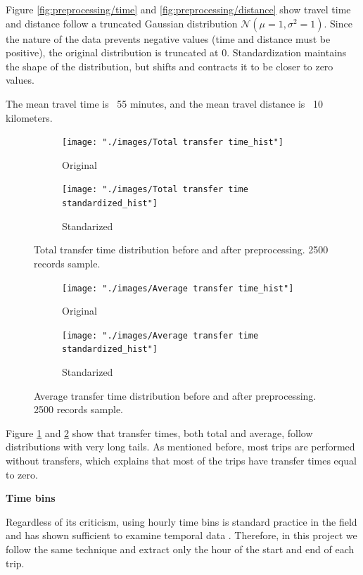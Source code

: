\documentclass{article}
\begin{document}
Figure \ref{fig:preprocessing/time} and \ref{fig:preprocessing/distance} show travel time and distance follow a truncated Gaussian distribution $\mathcal{N}(\mu = 1, \sigma^2 = 1)$. Since the nature of the data prevents negative values (time and distance must be positive), the original distribution is truncated at 0. Standardization maintains the shape of the distribution, but shifts and contracts it to be closer to zero values.

The mean travel time is ~55 minutes, and the mean travel distance is ~10 kilometers.  
 
\begin{figure}[H]
  \centering
  \begin{subfigure}[b]{.45\textwidth}
  	\centering
  	\texttt{[image: "./images/Total transfer time\_hist"]}
  	\caption{Original}
  \end{subfigure}
  \begin{subfigure}[b]{.45\textwidth}
  	\centering
  	\texttt{[image: "./images/Total transfer time standardized\_hist"]}
  	\caption{Standarized}
  \end{subfigure}
  \caption{Total transfer time distribution before and after preprocessing. 2500 records sample.}
  	\label{fig:preprocessing/transfer_time}
\end{figure}

\begin{figure}[H]
  \centering
  \begin{subfigure}[b]{.45\textwidth}
  	\centering
  	\texttt{[image: "./images/Average transfer time\_hist"]}
  	\caption{Original}
  \end{subfigure}
  \begin{subfigure}[b]{.45\textwidth}
  	\centering
  	\texttt{[image: "./images/Average transfer time standardized\_hist"]}
  	\caption{Standarized}
  \end{subfigure}
  \caption{Average transfer time distribution before and after preprocessing. 2500 records sample.}
  	\label{fig:preprocessing/transfer_avg}
\end{figure}

Figure \ref{fig:preprocessing/transfer_time} and \ref{fig:preprocessing/transfer_avg} show that transfer times, both total and average, follow distributions with very long tails. As mentioned before, most trips are performed without transfers, which explains that most of the trips have transfer times equal to zero.

\textbf{Time bins}

Regardless of its criticism, using hourly time bins is standard practice in the field and has shown sufficient to examine temporal data \cite{langlois2016inferring} \cite{ma2017understanding} \cite{morency2007measuring}. Therefore, in this project we follow the same technique and extract only the hour of the start and end of each trip.
\end{document}

